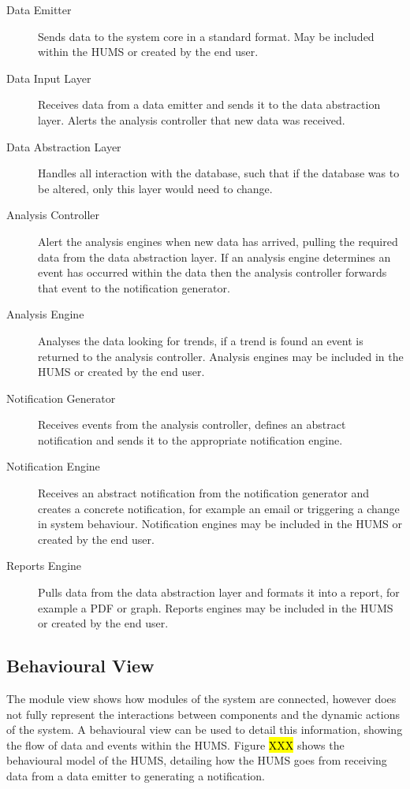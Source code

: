 \documentclass[10pt,a4paper]{article}
\begin{document}
\begin{description}
\item[Data Emitter]  Sends data to the system core in a standard format. May be included within the HUMS or created by the end user.
\item[Data Input Layer] Receives data from a data emitter and sends it to the data abstraction layer. Alerts the analysis controller that new data was received.
\item[Data Abstraction Layer] Handles all interaction with the database, such that if the database was to be altered, only this layer would need to change.
\item[Analysis Controller] Alert the analysis engines when new data has arrived, pulling the required data from the data abstraction layer. If an analysis engine determines an event has occurred within the data then the analysis controller forwards that event to the notification generator.
 \item[Analysis Engine] Analyses the data looking for trends, if a trend is found an event is returned to the analysis controller. Analysis engines may be included in the HUMS or created by the end user.
 \item[Notification Generator] Receives events from the analysis controller, defines an abstract notification and sends it to the appropriate notification engine.
 \item[Notification Engine] Receives an abstract notification from the notification generator and creates a concrete notification, for example an email or triggering a change in system behaviour. Notification engines may be included in the HUMS or created by the end user.
  \item[Reports Engine] Pulls data from the data abstraction layer and formats it into a report, for example a PDF or graph. Reports engines may be included in the HUMS or created by the end user.
\end{description}

\subsection{Behavioural View}
The module view shows how modules of the system are connected, however does not fully represent the interactions between components and the dynamic actions of the system.
A behavioural view can be used to detail this information, showing the flow of data and events within the HUMS. Figure \hl{XXX} shows the behavioural model of the HUMS, detailing how the HUMS goes from receiving data from a data emitter to generating a notification.
\end{document}
